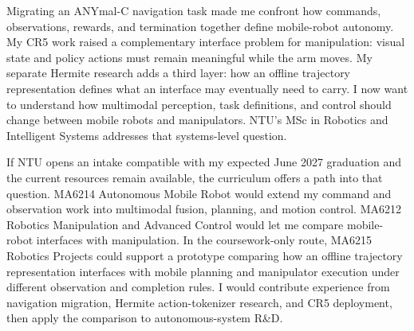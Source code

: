 Migrating an ANYmal-C navigation task made me confront how commands, observations, rewards, and termination together define mobile-robot autonomy. My CR5 work raised a complementary interface problem for manipulation: visual state and policy actions must remain meaningful while the arm moves. My separate Hermite research adds a third layer: how an offline trajectory representation defines what an interface may eventually need to carry. I now want to understand how multimodal perception, task definitions, and control should change between mobile robots and manipulators. NTU's MSc in Robotics and Intelligent Systems addresses that systems-level question.

If NTU opens an intake compatible with my expected June 2027 graduation and the current resources remain available, the curriculum offers a path into that question. MA6214 Autonomous Mobile Robot would extend my command and observation work into multimodal fusion, planning, and motion control. MA6212 Robotics Manipulation and Advanced Control would let me compare mobile-robot interfaces with manipulation. In the coursework-only route, MA6215 Robotics Projects could support a prototype comparing how an offline trajectory representation interfaces with mobile planning and manipulator execution under different observation and completion rules. I would contribute experience from navigation migration, Hermite action-tokenizer research, and CR5 deployment, then apply the comparison to autonomous-system R\&D.
